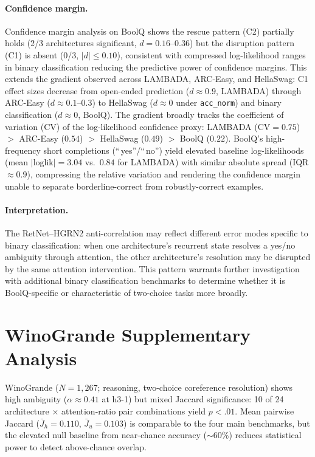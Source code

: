 \paragraph{Confidence margin.} Confidence margin analysis on BoolQ shows the rescue pattern (C2) partially holds (2/3 architectures significant, $d = 0.16$--$0.36$) but the disruption pattern (C1) is absent (0/3, $|d| \leq 0.10$), consistent with compressed log-likelihood ranges in binary classification reducing the predictive power of confidence margins. This extends the gradient observed across LAMBADA, ARC-Easy, and HellaSwag: C1 effect sizes decrease from open-ended prediction ($d \approx 0.9$, LAMBADA) through ARC-Easy ($d \approx 0.1$--$0.3$) to HellaSwag ($d \approx 0$ under \texttt{acc\_norm}) and binary classification ($d \approx 0$, BoolQ). The gradient broadly tracks the coefficient of variation (CV) of the log-likelihood confidence proxy: LAMBADA ($\text{CV} = 0.75$) $>$ ARC-Easy ($0.54$) $>$ HellaSwag ($0.49$) $>$ BoolQ ($0.22$). BoolQ's high-frequency short completions (``\,yes''/``\,no'') yield elevated baseline log-likelihoods (mean $|\text{loglik}| = 3.04$ vs.\ $0.84$ for LAMBADA) with similar absolute spread (IQR $\approx 0.9$), compressing the relative variation and rendering the confidence margin unable to separate borderline-correct from robustly-correct examples.

\paragraph{Interpretation.} The RetNet--HGRN2 anti-correlation may reflect different error modes specific to binary classification: when one architecture's recurrent state resolves a yes/no ambiguity through attention, the other architecture's resolution may be disrupted by the same attention intervention. This pattern warrants further investigation with additional binary classification benchmarks to determine whether it is BoolQ-specific or characteristic of two-choice tasks more broadly.

\section{WinoGrande Supplementary Analysis}
\label{app:winogrande}

WinoGrande ($N = 1{,}267$; reasoning, two-choice coreference resolution) shows high ambiguity ($\alpha \approx 0.41$ at h3-1) but mixed Jaccard significance: 10 of 24 architecture $\times$ attention-ratio pair combinations yield $p < .01$. Mean pairwise Jaccard ($\bar{J}_h = 0.110$, $\bar{J}_u = 0.103$) is comparable to the four main benchmarks, but the elevated null baseline from near-chance accuracy (${\sim}60\%$) reduces statistical power to detect above-chance overlap.

